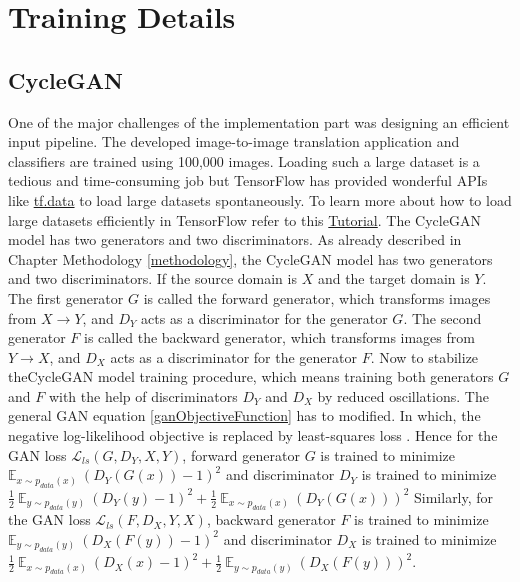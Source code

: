 \section{Training Details}\label{TrainingDetails}




\subsection{CycleGAN}\label{TrainingDetailsCycleGAN}
One of the major challenges of the implementation part was designing an efficient input pipeline. The developed image-to-image translation application and classifiers are trained using 100,000 images. Loading such a large dataset is a tedious and time-consuming job but TensorFlow has provided wonderful APIs like \href{https://www.tensorflow.org/guide/data}{tf.data} to load large datasets spontaneously. To learn more about how to load large datasets efficiently in TensorFlow refer to this \href{https://www.tensorflow.org/tutorials/load_data/images}{Tutorial}. The \ac{CycleGAN} model has two generators and two discriminators. As already described in Chapter Methodology \ref{methodology}, the \ac{CycleGAN} model has two generators and two discriminators. If the source domain is $X$ and the target domain is $Y$. The first generator $G$ is called the forward generator, which transforms images from $X \rightarrow Y$, and $D_Y$ acts as a discriminator for the generator $G$. The second generator $F$ is called the backward generator, which transforms images from $Y \rightarrow X$, and $D_X$ acts as a discriminator for the generator $F$. Now to stabilize the\ac{CycleGAN} model training procedure, which means training both generators $G$ and $F$ with the help of discriminators $D_Y$ and $D_X$ by reduced oscillations. The general \ac{GAN} equation \ref{ganObjectiveFunction} has to modified. In which, the negative log-likelihood objective is replaced by least-squares loss \cite{mao2017squares}. Hence for the GAN loss $\mathcal{L}_{ls}(G, D_Y, X, Y)$, forward generator $G$ is trained to minimize $\mathbb{E}_{x \sim p_{data}(x)}\ (D_Y(G(x)) - 1)^2$ and discriminator $D_Y$ is trained to minimize  $\frac{1}{2}\ \mathbb{E}_{y \sim p_{data}(y)}\ (D_Y(y) - 1)^2 + \frac{1}{2}\ \mathbb{E}_{x \sim p_{data}(x)}\ (D_Y(G(x)))^2$ Similarly, for the GAN loss $\mathcal{L}_{ls}(F, D_X, Y, X)$, backward generator $F$ is trained to minimize $\mathbb{E}_{y \sim p_{data}(y)}\ (D_X(F(y)) - 1)^2$ and discriminator $D_X$ is trained to minimize $\frac{1}{2}\ \mathbb{E}_{x \sim p_{data}(x)}\ (D_X(x) - 1)^2 + \frac{1}{2}\ \mathbb{E}_{y \sim p_{data}(y)}\ (D_X(F(y)))^2$.

